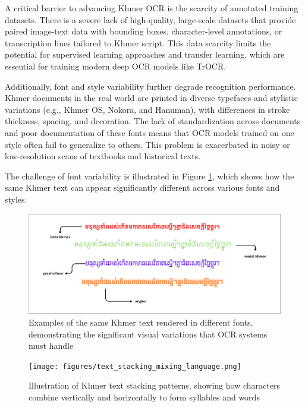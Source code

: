 A critical barrier to advancing Khmer OCR is the scarcity of annotated training datasets. There is a severe lack of high-quality, large-scale datasets that provide paired image-text data with bounding boxes, character-level annotations, or transcription lines tailored to Khmer script. This data scarcity limits the potential for supervised learning approaches and transfer learning, which are essential for training modern deep OCR models like TrOCR.


Additionally, font and style variability further degrade recognition performance. Khmer documents in the real world are printed in diverse typefaces and stylistic variations (e.g., Khmer OS, Nokora, and Hanuman), with differences in stroke thickness, spacing, and decoration. The lack of standardization across documents and poor documentation of these fonts means that OCR models trained on one style often fail to generalize to others. This problem is exacerbated in noisy or low-resolution scans of textbooks and historical texts.

The challenge of font variability is illustrated in Figure \ref{fig:font_variants}, which shows how the same Khmer text can appear significantly different across various fonts and styles.

\begin{figure}[ht]
    \centering
    \includegraphics[width=\textwidth]{figures/varianty_of_font.png}
    \caption{Examples of the same Khmer text rendered in different fonts, demonstrating the significant visual variations that OCR systems must handle}
    \label{fig:font_variants}
\end{figure}

\begin{figure}[ht]
    \centering
    \texttt{[image: figures/text\_stacking\_mixing\_language.png]}
    \caption{Illustration of Khmer text stacking patterns, 
    showing how characters combine vertically and horizontally 
    to form syllables and words \citep{buoy2023khmerocr}}
    \label{fig:text_stacking}
\end{figure}

